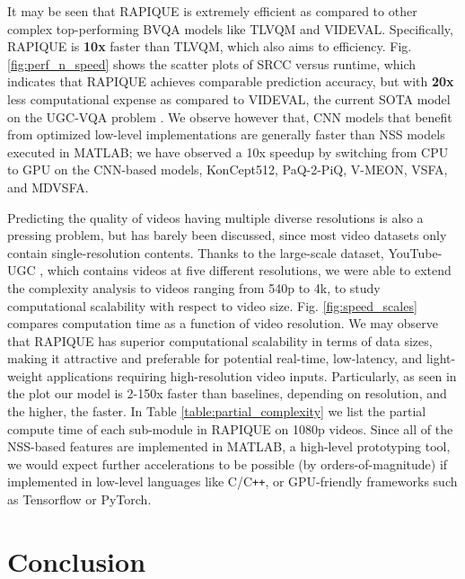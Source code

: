 \documentclass[transmag]{IEEEtran}
\begin{document}
It may be seen that RAPIQUE is extremely efficient as compared to other complex top-performing BVQA models like TLVQM and VIDEVAL. Specifically, RAPIQUE is \textbf{10x} faster than TLVQM, which also aims to efficiency. Fig. \ref{fig:perf_n_speed} shows the scatter plots of SRCC versus runtime, which indicates that RAPIQUE achieves comparable prediction accuracy, but with \textbf{20x} less computational expense as compared to VIDEVAL, the current SOTA model on the UGC-VQA problem \cite{tu2020ugc}. We observe however that, CNN models that benefit from optimized low-level implementations are generally faster than NSS models executed in MATLAB; we have observed a 10x speedup by switching from CPU to GPU on the CNN-based models, KonCept512, PaQ-2-PiQ, V-MEON, VSFA, and MDVSFA.

Predicting the quality of videos having multiple diverse resolutions is also a pressing problem, but has barely been discussed, since most video datasets only contain single-resolution contents. Thanks to the large-scale dataset, YouTube-UGC \cite{wang2019youtube}, which contains videos at five different resolutions, we were able to extend the complexity analysis to videos ranging from 540p to 4k, to study computational scalability with respect to video size. Fig. \ref{fig:speed_scales} compares computation time as a function of video resolution. We may observe that RAPIQUE has superior computational scalability in terms of data sizes, making it attractive and preferable for potential real-time, low-latency, and light-weight applications requiring high-resolution video inputs. Particularly, as seen in the plot our model is 2-150x faster than baselines, depending on resolution, and the higher, the faster. In Table \ref{table:partial_complexity} we list the partial compute time of each sub-module in RAPIQUE on 1080p videos. Since all of the NSS-based features are implemented in MATLAB, a high-level prototyping tool, we would expect further accelerations to be possible (by orders-of-magnitude) if implemented in low-level languages like C/C\texttt{++}, or GPU-friendly frameworks such as Tensorflow or PyTorch.

\section{Conclusion}
\label{conclusion}
\end{document}
